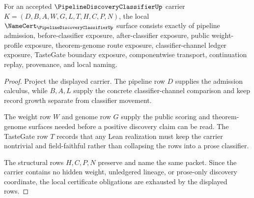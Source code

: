 \begin{theorem}
\label{thm:pipeline-discovery-classifier-namecert-obligations}
For an accepted $\PipelineDiscoveryClassifierUp$ carrier $K=(D,B,A,W,G,L,T,H,C,P,N)$, the local $\NameCert_{\PipelineDiscoveryClassifierUp}$ surface consists exactly of pipeline admission, before-classifier exposure, after-classifier exposure, public weight-profile exposure, theorem-genome route exposure, classifier-channel ledger exposure, TasteGate boundary exposure, componentwise transport, continuation replay, provenance, and local naming.
\end{theorem}
\begin{proof}
Project the displayed carrier. The pipeline row $D$ supplies the admission calculus, while $B,A,L$ supply the concrete classifier-channel comparison and keep record growth separate from classifier movement.

The weight row $W$ and genome row $G$ supply the public scoring and theorem-genome surfaces needed before a positive discovery claim can be read. The TasteGate row $T$ records that any Lean realization must keep the carrier nontrivial and field-faithful rather than collapsing the rows into a prose classifier.

The structural rows $H,C,P,N$ preserve and name the same packet. Since the carrier contains no hidden weight, unledgered lineage, or prose-only discovery coordinate, the local certificate obligations are exhausted by the displayed rows.
\end{proof}

